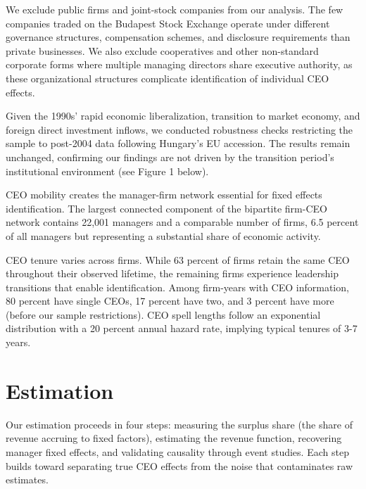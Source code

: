 \documentclass[11pt,a4paper]{article}
\begin{document}
We exclude public firms and joint-stock companies from our analysis. The few companies traded on the Budapest Stock Exchange operate under different governance structures, compensation schemes, and disclosure requirements than private businesses. We also exclude cooperatives and other non-standard corporate forms where multiple managing directors share executive authority, as these organizational structures complicate identification of individual CEO effects.



Given the 1990s' rapid economic liberalization, transition to market economy, and foreign direct investment inflows, we conducted robustness checks restricting the sample to post-2004 data following Hungary's EU accession. The results remain unchanged, confirming our findings are not driven by the transition period's institutional environment (see Figure 1 below).

CEO mobility creates the manager-firm network essential for fixed effects identification. The largest connected component of the bipartite firm-CEO network contains 22,001 managers and a comparable number of firms, 6.5 percent of all managers but representing a substantial share of economic activity.

CEO tenure varies across firms. While 63 percent of firms retain the same CEO throughout their observed lifetime, the remaining firms experience leadership transitions that enable identification. Among firm-years with CEO information, 80 percent have single CEOs, 17 percent have two, and 3 percent have more (before our sample restrictions). CEO spell lengths follow an exponential distribution with a 20 percent annual hazard rate, implying typical tenures of 3-7 years.




\section{Estimation}

Our estimation proceeds in four steps: measuring the surplus share (the share of revenue accruing to fixed factors), estimating the revenue function, recovering manager fixed effects, and validating causality through event studies. Each step builds toward separating true CEO effects from the noise that contaminates raw estimates.
\end{document}
